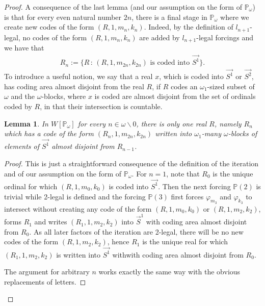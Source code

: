 \documentclass[a4paper,11pt]{article}
\newtheorem{lemma}[theorem]{Lemma}
\newcommand{\forceP}{\mathbb{P}}
\begin{document}
\begin{proof}
A consequence of the last lemma (and our assumption on the form of $\forceP_{\omega}$) is that for every even natural number $2n$, there is a final stage in $\forceP_{\omega}$ where we create new codes of the form $(R,1,m_{n},k_{n})$. Indeed, by the definition of $l_{n+1}$-legal, no codes of the form $(R,1,m_{n},k_{n})$ are added by $l_{n+1}$-legal forcings and we have that
\begin{align*}
R_{n}:=  \{ R \, : \,  (R, 1,m_{2n},k_{2n}) \text{ is coded into } \vec{S^1} \}.
\end{align*}
To introduce a useful notion, we say that a real $x$, which is coded into $\vec{S^1}$ or $\vec{S^2}$, has coding area almost disjoint from the real $R$, if $R$ codes an $\omega_1$-sized subset of $\omega$ and the $\omega$-blocks, where $x$ is coded are almost disjoint from the set of ordinals coded by $R$, in that their intersection is countable.

\begin{lemma}
In $W[\forceP_{\omega}]$ for every $n \in \omega \backslash 0$, there is only one real $R$, namely $R_{n}$ which has a code of the form $(R_n,1,m_{2n},k_{2n})$ written into $\omega_1$-many  $\omega$-blocks of elements of $\vec{S^1}$ almost disjoint from $R_{n-1}$.
\end{lemma}
\begin{proof}
This is just a straightforward consequence of the definition of the iteration and of our assumption on the form of $\forceP_{\omega}$.  For $n=1$, note that $R_0$ is the unique ordinal for which $(R,1,m_0,k_0)$ is coded into $\vec{S^1}$. Then the next forcing $\forceP(2)$ is trivial while 2-legal is defined and the forcing $\forceP(3)$ first forces $\varphi_{m_3}$ and $\varphi_{k_3}$ to intersect without creating any code of the form $(R,1,m_0,k_0)$ or $(R,1,m_2,k_2)$, forms $R_1$ and writes $(R_1,1,m_2,k_2)$ into $\vec{S}^1$ with coding area almost disjoint from $R_0$. As all later factors of the iteration are 2-legal, there will be no new codes of the form $(R,1,m_2,k_2)$, hence $R_1$ is the unique real for which $(R_1,1,m_2,k_2)$ is written into $\vec{S^1}$ withwith coding area almost disjoint from $R_0$.

The argument for arbitrary $n$ works exactly the same way with the obvious replacements of letters.


\end{proof}
\end{proof}
\end{document}

